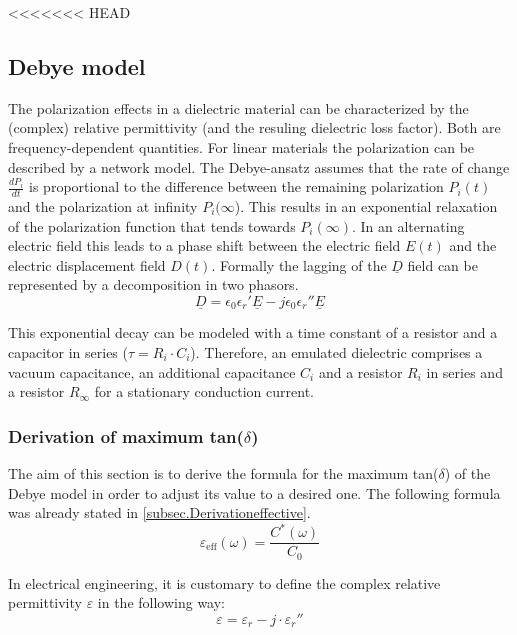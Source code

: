 <<<<<<< HEAD
\subsection{Debye model}
The polarization effects in a dielectric material can be characterized by the (complex) relative permittivity (and the resuling dielectric loss factor). Both are frequency-dependent quantities. 
For linear materials the polarization can be described by a network model. The Debye-ansatz assumes that the rate of change $ \frac{dP_i}{dt}$ is proportional to the difference between the remaining polarization $P_i(t)$  and the polarization at infinity $P_i(\infty$). This results in an exponential relaxation of the polarization function that tends towards $P_i(\infty)$. In an alternating electric field this leads to a phase shift between the electric field $E(t)$ and the 
electric displacement field $D(t)$.
\newline
Formally the lagging of the $\underline{D}$ field can be represented by a decomposition in two phasors.
\begin{equation}
 \underline{D}=\epsilon_{0}\epsilon_{r}'\underline{E}-j\epsilon_{0}\epsilon_{r}''\underline{E}
\end{equation}


This exponential decay can be modeled with a time constant of a resistor and a capacitor in series ($\tau=R_i \cdot C_i$). Therefore, an emulated dielectric comprises a vacuum capacitance, an additional capacitance $C_i$ and a resistor $R_i$ in series and a resistor $R_{\infty}$ for a stationary conduction current. 


\subsubsection{Derivation of maximum tan($\delta$)}
The aim of this section is to derive the formula for the maximum tan($\delta$) of the Debye model in order to adjust its value to a desired one. The following formula was already stated in \ref{subsec.Derivationeffective}.
\begin{equation}
\varepsilon_{\textrm{eff}} (\omega) = \frac{C^*(\omega)}{C_0}
\end{equation}

In electrical engineering, it is customary to define the  complex relative permittivity $\varepsilon$ in the following way: 
\begin{equation}
\varepsilon  = \varepsilon_r-j \cdot \varepsilon_r''
\end{equation}

